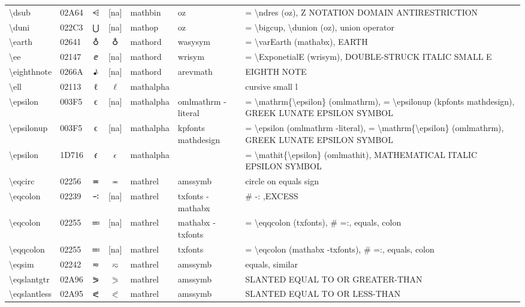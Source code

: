 \documentclass[a4paper,landscape]{article}
\begin{document}
\begin{longtable}{llcclll}
\textbackslash{}dsub & 02A64 & ⩤ & [na] & mathbin & oz & = \textbackslash{}ndres (oz), Z NOTATION DOMAIN ANTIRESTRICTION \\
\textbackslash{}duni & 022C3 & ⋃ & [na] & mathop & oz & = \textbackslash{}bigcup,  \textbackslash{}dunion (oz),  union operator \\
\textbackslash{}earth & 02641 & \textsf ♁ & $\earth$ & mathord & wasysym & = \textbackslash{}varEarth (mathabx), EARTH \\
\textbackslash{}ee & 02147 & ⅇ & [na] & mathord & wrisym & = \textbackslash{}ExponetialE (wrisym),  DOUBLE-STRUCK ITALIC SMALL E \\
\textbackslash{}eighthnote & 0266A & ♪ & [na] & mathord & arevmath & EIGHTH NOTE \\
\textbackslash{}ell & 02113 & ℓ & $\ell$ & mathalpha &  & cursive small l \\
\textbackslash{}epsilon & 003F5 & ϵ & [na] & mathalpha & omlmathrm -literal & = \textbackslash{}mathrm\{\textbackslash{}epsilon\} (omlmathrm), = \textbackslash{}epsilonup (kpfonts mathdesign), GREEK LUNATE EPSILON SYMBOL \\
\textbackslash{}epsilonup & 003F5 & ϵ & [na] & mathalpha & kpfonts mathdesign & = \textbackslash{}epsilon (omlmathrm -literal), = \textbackslash{}mathrm\{\textbackslash{}epsilon\} (omlmathrm),  GREEK LUNATE EPSILON SYMBOL \\
\textbackslash{}epsilon & 1D716 & 𝜖 & $\epsilon$ & mathalpha &  & = \textbackslash{}mathit\{\textbackslash{}epsilon\} (omlmathit), MATHEMATICAL ITALIC EPSILON SYMBOL \\
\textbackslash{}eqcirc & 02256 & ≖ & $\eqcirc$ & mathrel & amssymb & circle on equals sign \\
\textbackslash{}eqcolon & 02239 & ∹ & [na] & mathrel & txfonts -mathabx & \# -: ,EXCESS \\
\textbackslash{}eqcolon & 02255 & ≕ & [na] & mathrel & mathabx -txfonts & = \textbackslash{}eqqcolon (txfonts), \# =:, equals, colon \\
\textbackslash{}eqqcolon & 02255 & ≕ & [na] & mathrel & txfonts & = \textbackslash{}eqcolon (mathabx -txfonts),  \# =:,  equals,  colon \\
\textbackslash{}eqsim & 02242 & ≂ & $\eqsim$ & mathrel & amssymb & equals, similar \\
\textbackslash{}eqslantgtr & 02A96 & ⪖ & $\eqslantgtr$ & mathrel & amssymb & SLANTED EQUAL TO OR GREATER-THAN \\
\textbackslash{}eqslantless & 02A95 & ⪕ & $\eqslantless$ & mathrel & amssymb & SLANTED EQUAL TO OR LESS-THAN \\

\end{longtable}
\end{document}
